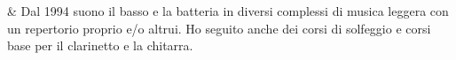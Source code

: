 & Dal 1994 suono il basso e la batteria in diversi complessi di musica leggera con un repertorio proprio e/o altrui. Ho seguito anche dei corsi di solfeggio e corsi base per il clarinetto e la chitarra.\\